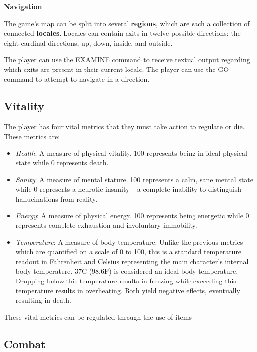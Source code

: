 \documentclass[11pt]{article}
\begin{document}
	\textbf{Navigation}
	\newline
	
	The game's map can be split into several \textbf{regions}, which are each a collection of connected \textbf{locales}. Locales can contain exits in twelve possible directions: the eight cardinal directions, up, down, inside, and outside.
	
	The player can use the EXAMINE command to receive textual output regarding which exits are present in their current locale. The player can use the GO command to attempt to navigate in a direction.
	
	\subsection{Vitality}
	
	The player has four vital metrics that they must take action to regulate or die. These metrics are:
	
	\begin{itemize}
		\item \textit{Health}: A measure of physical vitality. 100 represents being in ideal physical state while 0 represents death.
		\item \textit{Sanity}: A measure of mental stature. 100 represents a calm, sane mental state while 0 represents a neurotic insanity -- a complete inability to distinguish hallucinations from reality.
		\item \textit{Energy}: A measure of physical energy. 100 represents being energetic while 0 represents complete exhaustion and involuntary immobility.
		\item \textit{Temperature}: A measure of body temperature. Unlike the previous metrics which are quantified on a scale of 0 to 100, this is a standard temperature readout in Fahrenheit and Celsius representing the main character's internal body temperature. 37\textdegree C (98.6\textdegree F) is considered an ideal body temperature. Dropping below this temperature results in freezing while exceeding this temperature results in overheating. Both yield negative effects, eventually resulting in death.
	\end{itemize}

	These vital metrics can be regulated through the use of items
	
	\subsection{Combat}
	
\end{document}
